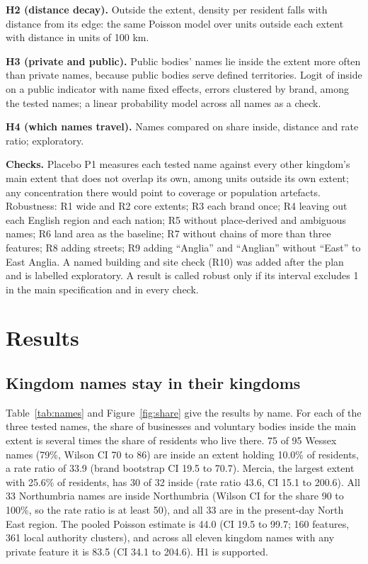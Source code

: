 \documentclass[11pt,a4paper]{article}
\begin{document}
\textbf{H2 (distance decay).} Outside the extent, density per resident falls with distance from its edge: the same Poisson model over units outside each extent with distance in units of 100 km.

\textbf{H3 (private and public).} Public bodies' names lie inside the extent more often than private names, because public bodies serve defined territories. Logit of inside on a public indicator with name fixed effects, errors clustered by brand, among the tested names; a linear probability model across all names as a check.

\textbf{H4 (which names travel).} Names compared on share inside, distance and rate ratio; exploratory.

\textbf{Checks.} Placebo P1 measures each tested name against every other kingdom's main extent that does not overlap its own, among units outside its own extent; any concentration there would point to coverage or population artefacts. Robustness: R1 wide and R2 core extents; R3 each brand once; R4 leaving out each English region and each nation; R5 without place-derived and ambiguous names; R6 land area as the baseline; R7 without chains of more than three features; R8 adding streets; R9 adding ``Anglia'' and ``Anglian'' without ``East'' to East Anglia. A named building and site check (R10) was added after the plan and is labelled exploratory. A result is called robust only if its interval excludes 1 in the main specification and in every check.

\section{Results}\label{sec:results}
\subsection{Kingdom names stay in their kingdoms}
Table~\ref{tab:names} and Figure~\ref{fig:share} give the results by name. For each of the three tested names, the share of businesses and voluntary bodies inside the main extent is several times the share of residents who live there. 75 of 95 Wessex names (79\%, Wilson CI 70 to 86) are inside an extent holding 10.0\% of residents, a rate ratio of 33.9 (brand bootstrap CI 19.5 to 70.7). Mercia, the largest extent with 25.6\% of residents, has 30 of 32 inside (rate ratio 43.6, CI 15.1 to 200.6). All 33 Northumbria names are inside Northumbria (Wilson CI for the share 90 to 100\%, so the rate ratio is at least 50), and all 33 are in the present-day North East region. The pooled Poisson estimate is 44.0 (CI 19.5 to 99.7; 160 features, 361 local authority clusters), and across all eleven kingdom names with any private feature it is 83.5 (CI 34.1 to 204.6). H1 is supported.
\end{document}
